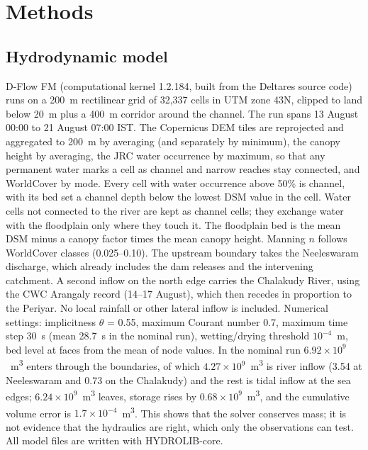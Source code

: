 \documentclass[preprint,12pt,authoryear]{elsarticle}
\begin{document}
\section{Methods}
\label{sec:methods}

\subsection{Hydrodynamic model}
D-Flow FM \citep{kernkamp2011} (computational kernel 1.2.184, built from the Deltares source code) runs on a 200~m rectilinear grid of 32,337 cells in UTM zone 43N, clipped to land below 20~m plus a 400~m corridor around the channel. The run spans 13 August 00:00 to 21 August 07:00 IST. The Copernicus DEM tiles are reprojected and aggregated to 200~m by averaging (and separately by minimum), the canopy height by averaging, the JRC water occurrence by maximum, so that any permanent water marks a cell as channel and narrow reaches stay connected, and WorldCover by mode. Every cell with water occurrence above 50\% is channel, with its bed set a channel depth below the lowest DSM value in the cell. Water cells not connected to the river are kept as channel cells; they exchange water with the floodplain only where they touch it. The floodplain bed is the mean DSM minus a canopy factor times the mean canopy height. Manning $n$ follows WorldCover classes (0.025--0.10). The upstream boundary takes the Neeleswaram discharge, which already includes the dam releases and the intervening catchment. A second inflow on the north edge carries the Chalakudy River, using the CWC Arangaly record (14--17 August), which then recedes in proportion to the Periyar. No local rainfall or other lateral inflow is included. Numerical settings: implicitness $\theta$ = 0.55, maximum Courant number 0.7, maximum time step 30~s (mean 28.7~s in the nominal run), wetting/drying threshold $10^{-4}$~m, bed level at faces from the mean of node values. In the nominal run $6.92\times10^9$~m\textsuperscript{3} enters through the boundaries, of which $4.27\times10^9$~m\textsuperscript{3} is river inflow (3.54 at Neeleswaram and 0.73 on the Chalakudy) and the rest is tidal inflow at the sea edges; $6.24\times10^9$~m\textsuperscript{3} leaves, storage rises by $0.68\times10^9$~m\textsuperscript{3}, and the cumulative volume error is $1.7\times10^{-4}$~m\textsuperscript{3}. This shows that the solver conserves mass; it is not evidence that the hydraulics are right, which only the observations can test. All model files are written with HYDROLIB-core.
\end{document}
